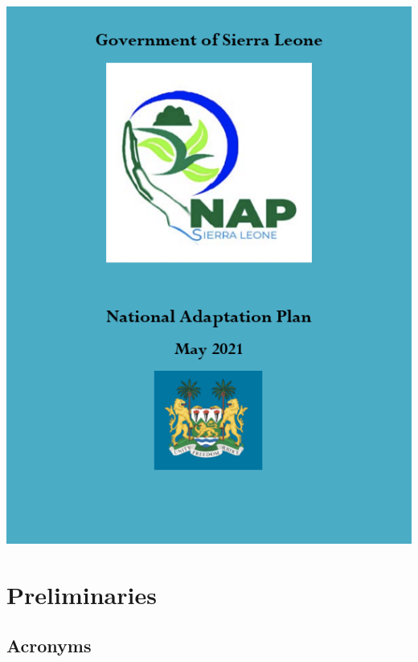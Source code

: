 \documentclass[
]{book}
\author{}
\date{\vspace{-2.5em}}
\begin{document}
{
\setcounter{tocdepth}{1}
\tableofcontents
}
\hypertarget{section}{%
\chapter*{}\label{section}}

\includegraphics[width=6.25in,height=\textheight]{images/logos.png}

\hypertarget{preliminaries}{%
\chapter{Preliminaries}\label{preliminaries}}

\hypertarget{acronyms}{%
\section{Acronyms}\label{acronyms}}

\providecommand{\docline}[3]{\noalign{\global\setlength{\arrayrulewidth}{#1}}\arrayrulecolor[HTML]{#2}\cline{#3}}
\end{document}
